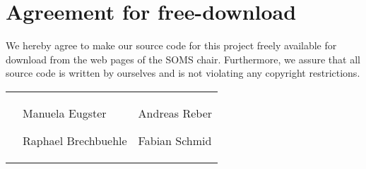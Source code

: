 \documentclass[11pt]{article}
\begin{document}

\newpage


\newpage
\section*{Agreement for free-download}
\bigskip


\bigskip


\large We hereby agree to make our source code for this project freely available for download from the web pages of the SOMS chair. Furthermore, we assure that all source code is written by ourselves and is not violating any copyright restrictions.

\begin{center}

\bigskip


\bigskip


\begin{tabular}{@{}p{3.3cm}@{}p{6cm}@{}@{}p{6cm}@{}}
\begin{minipage}{3cm}

\end{minipage}
&
\begin{minipage}{6cm}
\vspace{2mm} \large Manuela Eugster
\end{minipage}

\begin{minipage}{6cm}
\vspace{2mm} \large Raphael Brechbuehle
\end{minipage}
&
\begin{minipage}{6cm}
\vspace{2mm}\large Andreas Reber
\end{minipage}

\begin{minipage}{6cm}
\vspace{2mm} \large Fabian Schmid

\end{minipage}
\end{tabular}


\end{center}
\newpage




\end{document}
